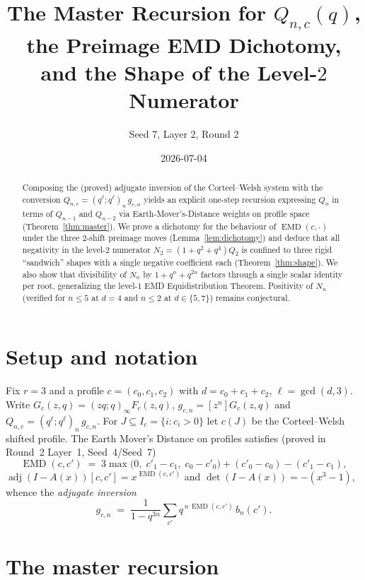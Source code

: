 \documentclass[11pt]{article}
\title{The Master Recursion for $Q_{n,c}(q)$, the Preimage EMD Dichotomy,\\
and the Shape of the Level-$2$ Numerator}
\author{Seed 7, Layer 2, Round 2}
\date{2026-07-04}
\newcommand{\EMD}{\operatorname{EMD}}
\begin{document}
\maketitle

\begin{abstract}
Composing the (proved) adjugate inversion of the Corteel--Welsh system with the
conversion $Q_{n,c}=(q^\ell;q^\ell)_n\,g_{c,n}$ yields an explicit one-step
recursion expressing $Q_n$ in terms of $Q_{n-1}$ and $Q_{n-2}$ via
Earth-Mover's-Distance weights on profile space (Theorem~\ref{thm:master}).
We prove a dichotomy for the behaviour of $\EMD(c,\cdot)$ under the three
$2$-shift preimage moves (Lemma~\ref{lem:dichotomy}) and deduce that all
negativity in the level-$2$ numerator $N_2=(1+q^2+q^4)Q_2$ is confined to three
rigid ``sandwich'' shapes with a single negative coefficient each
(Theorem~\ref{thm:shape}). We also show that divisibility of $N_n$ by
$1+q^n+q^{2n}$ factors through a single scalar identity per root, generalizing
the level-$1$ EMD Equidistribution Theorem. Positivity of $N_n$ (verified for
$n\le 5$ at $d=4$ and $n\le 2$ at $d\in\{5,7\}$) remains conjectural.
\end{abstract}

\section{Setup and notation}

Fix $r=3$ and a profile $c=(c_0,c_1,c_2)$ with $d=c_0+c_1+c_2$,
$\ell=\gcd(d,3)$. Write $G_c(z,q)=(zq;q)_\infty F_c(z,q)$,
$g_{c,n}=[z^n]G_c(z,q)$ and $Q_{n,c}=(q^\ell;q^\ell)_n\,g_{c,n}$.
For $J\subseteq I_c=\{i:c_i>0\}$ let $c(J)$ be the Corteel--Welsh shifted
profile. The Earth Mover's Distance on profiles satisfies (proved in Round~2
Layer~1, Seed~4/Seed~7)
\begin{equation}\label{eq:emd}
\EMD(c,c') \;=\; 3\max\bigl(0,\;c'_1-c_1,\;c_0-c'_0\bigr)+(c'_0-c_0)-(c'_1-c_1),
\end{equation}
$\operatorname{adj}(I-A(x))[c,c']=x^{\EMD(c,c')}$ and
$\det(I-A(x))=-(x^3-1)$, whence the \emph{adjugate inversion}
\begin{equation}\label{eq:inv}
g_{c,n}\;=\;\frac{1}{1-q^{3n}}\sum_{c'} q^{\,n\,\EMD(c,c')}\,b_n(c').
\end{equation}

\section{The master recursion}
\end{document}
